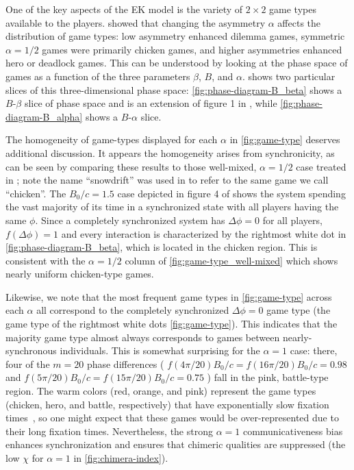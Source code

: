 \documentclass[pdflatex,lineno,referee,sn-mathphys-ay]{sn-jnl}
\begin{document}
One of the key aspects of the EK model
is the variety of $2 \times 2$ game types available to the players.
 showed that changing the asymmetry $\alpha$
affects the distribution of game types:
low asymmetry enhanced dilemma games,
symmetric $\alpha = 1/2$ games were primarily chicken games,
and higher asymmetries enhanced hero or deadlock games.
This can be understood by looking at the phase space of games
as a function of the three parameters $\beta$, $B$, and $\alpha$.
 shows two particular slices
of this three-dimensional phase space:
\cref{fig:phase-diagram-B_beta} shows a $B$-$\beta$ slice of phase space
and is an extension of figure 1 in \citet{tripp2022evolutionary},
while \cref{fig:phase-diagram-B_alpha} shows a $B$-$\alpha$ slice.

The homogeneity of game-types displayed for each $\alpha$ in \cref{fig:game-type}
deserves additional discussion.
It appears the homogeneity arises from synchronicity,
as can be seen by comparing these results
to those well-mixed, $\alpha = 1/2$ case treated in \citet{tripp2022evolutionary};
note the name ``snowdrift'' was used in \citet{tripp2022evolutionary}
to refer to the same game we \citep[and][]{bruns2015names} call ``chicken''.
The $B_0/c = 1.5$ case depicted in figure 4 of \citet{tripp2022evolutionary}
shows the system spending the vast majority of its time in a synchronized state
with all players having the same $\phi$.
Since a completely synchronized system has $\Delta \phi = 0$ for all players,
$f(\Delta \phi) = 1$ and every interaction is characterized
by the rightmost white dot in \cref{fig:phase-diagram-B_beta},
which is located in the chicken region.
This is consistent with the $\alpha = 1/2$ column
of \cref{fig:game-type_well-mixed} which shows nearly uniform chicken-type games.

Likewise, we note that the most frequent game types
in \cref{fig:game-type} across each $\alpha$ all correspond
to the completely synchronized $\Delta \phi = 0$ game type
(\ie the game type of the rightmost white dots \cref{fig:game-type}).
This indicates that the majority game type almost always
corresponds to games between nearly-synchronous individuals.
This is somewhat surprising for the $\alpha = 1$ case:
there, four of the $m = 20$ phase differences
(
$f(4\pi/20) B_0/c = f(16\pi/20) B_0/c = \num{0.98}$
and
$f(5\pi/20) B_0/c = f(15\pi/20) B_0/c = \num{0.75}$
)
fall in the pink, battle-type region.
The warm colors (red, orange, and pink)
represent the game types (chicken, hero, and battle, respectively)
that have exponentially slow fixation times~\citep{antal2006fixation},
so one might expect that these games would be over-represented
due to their long fixation times.
Nevertheless, the strong $\alpha = 1$ communicativeness bias
enhances synchronization and ensures that
chimeric qualities are suppressed
(\cf the low $\chi$ for $\alpha = 1$ in \cref{fig:chimera-index}).
\end{document}
